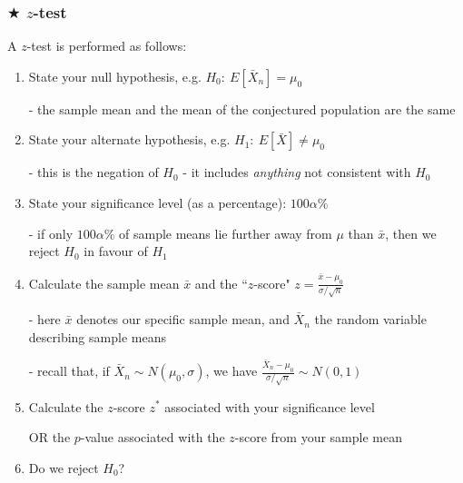 \documentclass[t,8pt]{beamer}%
\begin{document}
\begin{frame}
	\frametitle{$\bigstar$ $z$-test}
	A $z$-test is performed as follows:
	\begin{enumerate}
		\item State your null hypothesis, e.g. $H_0:\ E[\bar X_n]=\mu_0$ \par
		{\small\color{NavyBlue} - the sample mean and the mean of the conjectured population are the same}
		\item State your alternate hypothesis, e.g. $H_1:\ E[\bar X]\neq\mu_0$ \par
		{\small\color{NavyBlue} - this is the negation of $H_0$ - it includes {\it anything} not consistent with $H_0$}
		\item State your significance level (as a percentage): $100\alpha\%$\par
		{\small\color{NavyBlue} - if only $100\alpha\%$ of sample means lie further away from $\mu$ than $\bar x$, then we reject $H_0$ in favour of $H_1$}
		\item Calculate the sample mean $\bar x$ and the ``$z$-score" $z=\frac{\bar x-\mu_0}{\sigma/\sqrt n}$ \par
		{\small\color{NavyBlue} - here $\bar x$ denotes our specific sample mean, and $\bar X_n$ the random variable describing sample means \par
			- recall that, if $\bar X_n\sim N(\mu_0,\sigma)$, we have $\frac{\bar X_n-\mu_0}{\sigma/\sqrt n}\sim N(0,1)$}%
		\item Calculate the $z$-score $z^*$ associated with your significance level \par
            OR the $p$-value associated with the $z$-score from your sample mean
		\item Do we reject $H_0$?
	\end{enumerate}
\end{frame}
\end{document}
